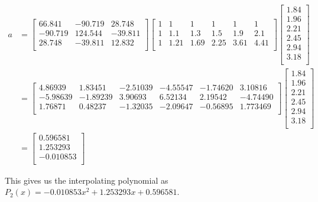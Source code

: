 \documentclass[10pt]{jhwhw}
\begin{document}
	\begin{align*}
	a &= 
	\left[\begin{array}{ccc}
		66.841 & -90.719 & 28.748 \\
		-90.719 & 124.544 & -39.811 \\
		28.748 & -39.811 & 12.832 \\
	\end{array} \right]
	\left[\begin{array}{ccc}
		1 & 1 & 1 & 1 & 1 & 1 \\
		1 & 1.1 & 1.3 & 1.5 & 1.9 & 2.1 \\
		1 & 1.21 & 1.69 & 2.25 & 3.61 & 4.41 \\
	\end{array} \right]
	\left[\begin{array}{c}
		1.84 \\ 1.96 \\ 2.21 \\ 2.45 \\ 2.94 \\ 3.18 \\
	\end{array} \right]
	\\ &= 
	\left[\begin{array}{cccccc}
		4.86939 & 1.83451 & -2.51039 & -4.55547 & -1.74620 & 3.10816 \\
		-5.98639 & -1.89239 & 3.90693 & 6.52134 & 2.19542 & -4.74490 \\
		1.76871 & 0.48237 & -1.32035 & -2.09647 & -0.56895 & 1.773469 \\
	\end{array} \right]
	\left[\begin{array}{c}
		1.84 \\ 1.96 \\ 2.21 \\ 2.45 \\ 2.94 \\ 3.18 \\
	\end{array} \right]
	\\ &= 
	\left[\begin{array}{c}
		0.596581 \\ 1.253293 \\ -0.010853 \\
	\end{array} \right]
	\end{align*}

	This gives us the interpolating polynomial as
	$
		P_2(x) = -0.010853x^2 + 1.253293x + 0.596581
	$.
\end{document}
